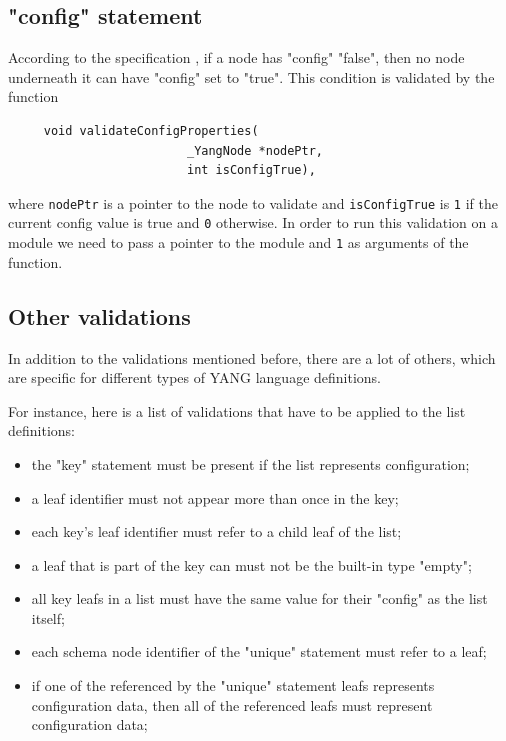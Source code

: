 \documentclass[conference]{IEEEtran}
\begin{document}
\subsection{"config" statement}
According to the specification \cite{bib4}, if a node has "config" "false", then no node underneath it can have "config" set to "true".
This condition is validated by the function
\small
\begin{verbatim}
     void validateConfigProperties(
                         _YangNode *nodePtr, 
                         int isConfigTrue),
\end{verbatim}
\normalsize
where \texttt{nodePtr} is a pointer to the node to validate and \texttt{isConfigTrue} is \texttt{1} if the current config value is true and \texttt{0} otherwise.
In order to run this validation on a module we need to pass a pointer to the module and \texttt{1} as arguments of the function. 

\subsection{Other validations}
In addition to the validations mentioned before, there are a lot of others, which are specific for different types of YANG language definitions.  

For instance, here is a list of validations that have to be applied to the list definitions:
\begin{itemize}
\item the "key" statement must be present if the list represents configuration;
\item a leaf identifier must not appear more than once in the key;
\item each key's leaf identifier must refer to a child leaf of the list;
\item a leaf that is part of the key can must not be the built-in type "empty";
\item all key leafs in a list must have the same value for their "config" as the list itself;
\item each schema node identifier of the "unique" statement must refer to a leaf;
\item if one of the referenced by the "unique" statement leafs represents configuration data, then all of the referenced leafs must represent configuration data;
\end{itemize}
\end{document}
